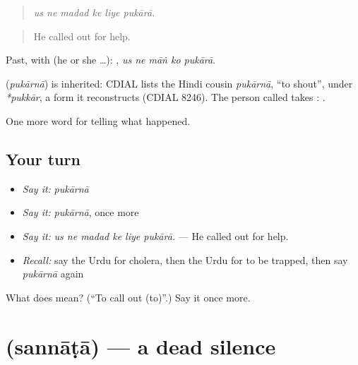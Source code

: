 \begin{quote}
     
\end{quote}

\begin{quote}
\emph{us ne madad ke liye pukārā.}
\end{quote}

\begin{quote}
He called out for help.
\end{quote}

Past, with  (he or she …):     , \emph{us ne māṅ ko pukārā}.

\begin{cousinweb}
\textbf{} (\emph{pukārnā}) is inherited: CDIAL lists the Hindi cousin \emph{pukārnā}, \textquotedblleft{}to shout\textquotedblright{}, under \emph{*pukkār}, a form it reconstructs (CDIAL 8246). The person called takes \textbf{}: \textbf{  }.
\end{cousinweb}

\begin{grammarlens}[title={What you've built}]
One more word for telling what happened.
\end{grammarlens}

\subsection*{Your turn}
\begin{itemize}
\raggedright
  \item \emph{Say it:} \emph{pukārnā}
  \item \emph{Say it:} \emph{pukārnā}, once more
  \item \emph{Say it:} \emph{us ne madad ke liye pukārā.} — He called out for help.
  \item \emph{Recall:} say the Urdu for cholera, then the Urdu for to be trapped, then say \emph{pukārnā} again
\end{itemize}

\begin{tcolorbox}[breakable,colback=teal!4,colframe=teal!35!black,title={Before you move on}]
What does  mean? (\textquotedblleft{}To call out (to)\textquotedblright{}.) Say it once more.
\end{tcolorbox}
\section[\texorpdfstring{\ur{سناٹا} (sannāṭā)}{سناٹا (sannāṭā)}]{ (sannāṭā) — a dead silence}

